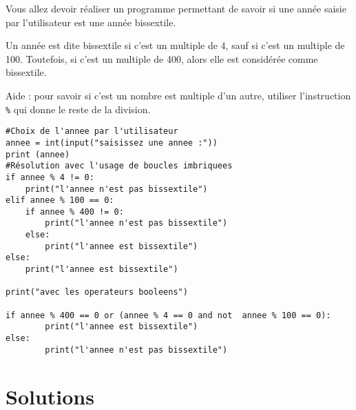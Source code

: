 \begin{Exercise}[title={Écrire un programme},counter={exo}]
Vous allez devoir réaliser un programme permettant de savoir si une année saisie par l'utilisateur est une année bissextile.

Un année est dite bissextile si c'est un multiple de 4, sauf si c'est un multiple de 100. Toutefois, si c'est un multiple de 400, alors elle est considérée comme bissextile.

Aide : pour savoir si c'est un nombre est multiple d'un autre, utiliser l'instruction \verb|%| qui donne le reste de la division.

\end{Exercise}
\begin{Answer}
\begin{lstlisting}[frame=lines, caption={Année bissextile},label=bissextile]
#Choix de l'annee par l'utilisateur
annee = int(input("saisissez une annee :"))
print (annee)
#Résolution avec l'usage de boucles imbriquees
if annee % 4 != 0:
    print("l'annee n'est pas bissextile")
elif annee % 100 == 0:
    if annee % 400 != 0:
		print("l'annee n'est pas bissextile")		
	else:	
		print("l'annee est bissextile")		
else:
	print("l'annee est bissextile")

print("avec les operateurs booleens")

if annee % 400 == 0 or (annee % 4 == 0 and not  annee % 100 == 0):
        print("l'annee est bissextile")
else: 
        print("l'annee n'est pas bissextile")
\end{lstlisting} 
\end{Answer}
\section{Solutions}
\shipoutAnswer


